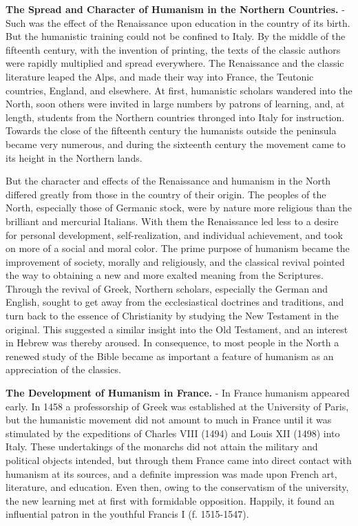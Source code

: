 \documentclass[]{book}
\begin{document}
\textbf{The Spread and Character of Humanism in the Northern Countries.} - Such was the effect of the Renaissance upon education in the country of its birth. But the humanistic training could not be confined to Italy. By the middle of the fifteenth century, with the invention of printing, the texts of the classic authors were rapidly multiplied and spread everywhere. The Renaissance and the classic literature leaped the Alps, and made their way into France, the Teutonic countries, England, and elsewhere. At first, humanistic scholars wandered into the North, soon others were invited in large numbers by patrons of learning, and, at length, students from the Northern countries thronged into Italy for instruction. Towards the close of the fifteenth century the humanists outside the peninsula became very numerous, and during the sixteenth century the movement came to its height in the Northern lands.

But the character and effects of the Renaissance and humanism in the North differed greatly from those in the country of their origin. The peoples of the North, especially those of Germanic stock, were by nature more religious than the brilliant and mercurial Italians. With them the Renaissance led less to a desire for personal development, self-realization, and individual achievement, and took on more of a social and moral color. The prime purpose of humanism became the improvement of society, morally and religiously, and the classical revival pointed the way to obtaining a new and more exalted meaning from the Scriptures. Through the revival of Greek, Northern scholars, especially the German and English, sought to get away from the ecclesiastical doctrines and traditions, and turn back to the essence of Christianity by studying the New Testament in the original. This suggested a similar insight into the Old Testament, and an interest in Hebrew was thereby aroused. In consequence, to most people in the North a renewed study of the Bible became as important a feature of humanism as an appreciation of the classics.

\textbf{The Development of Humanism in France.} - In France humanism appeared early. In 1458 a professorship of Greek was established at the University of Paris, but the humanistic movement did not amount to much in France until it was stimulated by the expeditions of Charles VIII (1494) and Louis XII (1498) into Italy. These undertakings of the monarchs did not attain the military and political objects intended, but through them France came into direct contact with humanism at its sources, and a definite impression was made upon French art, literature, and education. Even then, owing to the conservatism of the university, the new learning met at first with formidable opposition. Happily, it found an influential patron in the youthful Francis I (f. 1515-1547).
\end{document}
